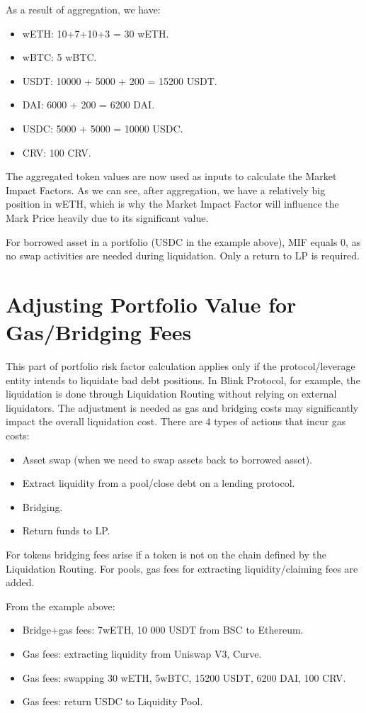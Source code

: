 \documentclass[conference]{IEEEtran}
\begin{document}
As a result of aggregation, we have:
\begin{itemize}
	\item wETH: 10+7+10+3 = 30 wETH.
	\item wBTC: 5 wBTC.
	\item USDT: 10000 + 5000 + 200 = 15200 USDT.
	\item DAI: 6000 + 200 = 6200 DAI.
	\item USDC: 5000 + 5000 = 10000 USDC.
	\item CRV: 100 CRV.
\end{itemize}

The aggregated token values are now used as inputs to calculate the Market Impact Factors. As we can see, after aggregation, we have a relatively big position in wETH, which is why the Market Impact Factor will influence the Mark Price heavily due to its significant value.

For borrowed asset in a portfolio (USDC in the example above), MIF equals 0, as no swap activities are needed during liquidation. Only a return to LP is required.

\section{Adjusting Portfolio Value for Gas/Bridging Fees}
This part of portfolio risk factor calculation applies only if the protocol/leverage entity intends to liquidate bad debt positions. In Blink Protocol, for example, the liquidation is done through Liquidation Routing without relying on external liquidators. The adjustment is needed as gas and bridging costs may significantly impact the overall liquidation cost. There are 4 types of actions that incur gas costs:

\begin{itemize}
	\item Asset swap (when we need to swap assets back to borrowed asset).
	\item Extract liquidity from a pool/close debt on a lending protocol.
	\item Bridging.
	\item Return funds to LP.
\end{itemize}

For tokens bridging fees arise if a token is not on the chain defined by the Liquidation Routing. For pools, gas fees for extracting liquidity/claiming fees are added.

From the example above:
\begin{itemize}
	\item Bridge+gas fees: 7wETH, 10 000 USDT from BSC to Ethereum.
	\item Gas fees: extracting liquidity from Uniswap V3, Curve.
	\item Gas fees: swapping 30 wETH, 5wBTC, 15200 USDT, 6200 DAI,  100 CRV.
	\item Gas fees: return USDC to Liquidity Pool.
\end{itemize}
\end{document}

